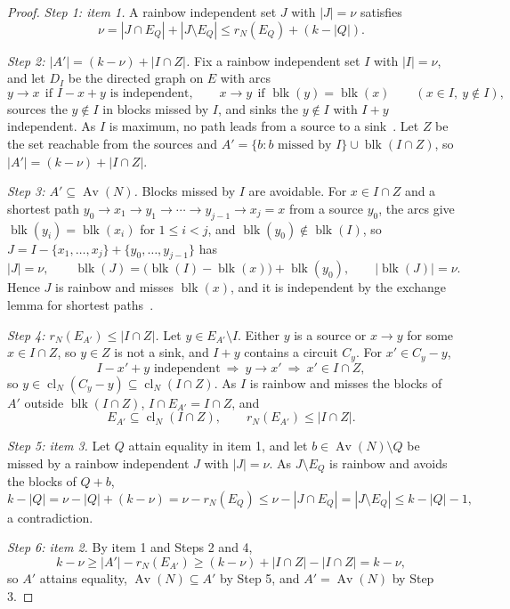 \documentclass[11pt]{article}
\newcommand{\cl}{\operatorname{cl}}
\newcommand{\blk}{\operatorname{blk}}
\newcommand{\Av}{\operatorname{Av}}
\begin{document}
\begin{proof}
\emph{Step 1: item 1.}  A rainbow independent set $J$ with $|J|=\nu$ satisfies
\[
  \nu=|J\cap E_Q|+|J\setminus E_Q|\le r_N(E_Q)+(k-|Q|).
\]

\emph{Step 2: $|A'|=(k-\nu)+|I\cap Z|$.}  Fix a rainbow independent set $I$ with
$|I|=\nu$, and let $D_I$ be the directed graph on $E$ with arcs
\[
  y\to x\ \ \text{if }I-x+y\text{ is independent},\qquad
  x\to y\ \ \text{if }\blk(y)=\blk(x)\qquad(x\in I,\ y\notin I),
\]
sources the $y\notin I$ in blocks missed by $I$, and sinks the $y\notin I$ with
$I+y$ independent.  As $I$ is maximum, no path leads from a source to a
sink~\cite{lawler75,schrijver03}.  Let $Z$ be the set reachable from the sources
and $A'=\{b:b\text{ missed by }I\}\cup\blk(I\cap Z)$, so
$|A'|=(k-\nu)+|I\cap Z|$.

\emph{Step 3: $A'\subseteq\Av(N)$.}  Blocks missed by $I$ are avoidable.  For
$x\in I\cap Z$ and a shortest path $y_0\to x_1\to y_1\to\cdots\to y_{j-1}\to x_j=x$
from a source $y_0$, the arcs give $\blk(y_i)=\blk(x_i)$ for $1\le i<j$, and
$\blk(y_0)\notin\blk(I)$, so $J=I-\{x_1,\ldots,x_j\}+\{y_0,\ldots,y_{j-1}\}$ has
\[
  |J|=\nu,\qquad\blk(J)=\bigl(\blk(I)-\blk(x)\bigr)+\blk(y_0),\qquad|\blk(J)|=\nu.
\]
Hence $J$ is rainbow and misses $\blk(x)$, and it is independent by the exchange
lemma for shortest paths~\cite{schrijver03}.

\emph{Step 4: $r_N(E_{A'})\le|I\cap Z|$.}  Let $y\in E_{A'}\setminus I$.  Either
$y$ is a source or $x\to y$ for some $x\in I\cap Z$, so $y\in Z$ is not a sink,
and $I+y$ contains a circuit $C_y$.  For $x'\in C_y-y$,
\[
  I-x'+y\text{ independent}\ \Rightarrow\ y\to x'\ \Rightarrow\ x'\in I\cap Z,
\]
so $y\in\cl_N(C_y-y)\subseteq\cl_N(I\cap Z)$.  As $I$ is rainbow and misses the
blocks of $A'$ outside $\blk(I\cap Z)$, $I\cap E_{A'}=I\cap Z$, and
\[
  E_{A'}\subseteq\cl_N(I\cap Z),\qquad r_N(E_{A'})\le|I\cap Z|.
\]

\emph{Step 5: item 3.}  Let $Q$ attain equality in item 1, and let
$b\in\Av(N)\setminus Q$ be missed by a rainbow independent $J$ with $|J|=\nu$.
As $J\setminus E_Q$ is rainbow and avoids the blocks of $Q+b$,
\[
  k-|Q|=\nu-|Q|+(k-\nu)=\nu-r_N(E_Q)\le\nu-|J\cap E_Q|=|J\setminus E_Q|\le k-|Q|-1,
\]
a contradiction.

\emph{Step 6: item 2.}  By item 1 and Steps 2 and 4,
\[
  k-\nu\ge|A'|-r_N(E_{A'})\ge(k-\nu)+|I\cap Z|-|I\cap Z|=k-\nu,
\]
so $A'$ attains equality, $\Av(N)\subseteq A'$ by Step 5, and $A'=\Av(N)$ by
Step 3.
\end{proof}
\end{document}
